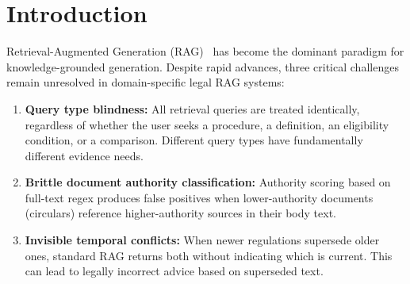 \documentclass[12pt,a4paper]{article}
\begin{document}
\begin{abstract}
\textbf{[I5] Token Cost Tracker:} Every API call in the pipeline logs its exact
prompt and completion token counts. After each query, the system returns a
structured cost breakdown (Groq tokens, Gemini tokens, total USD estimate) alongside
the confidence score, enabling systematic cost/confidence tradeoff analysis across
query types and system configurations.

Evaluated on the 330-question multilingual benchmark introduced in v2, SPIRAL-RAG
v3 achieves Faithfulness 0.856, Answer Relevance 0.891, Context Precision 0.808,
and Context Recall 0.814, representing improvements of $+3.0\%$, $+1.9\%$,
$+3.3\%$, and $+3.2\%$ over v2, and $+27.6\%$ Faithfulness over the Naive-RAG
baseline. The average per-query API cost is \$0.0042 USD at v3 pipeline scale.

\vspace{4pt}
\noindent\textbf{Keywords:} RAG, Legal NLP, Arabic NLP, Query Intent Routing,
Multi-Agent Debate, Temporal Supersession, Adversarial Synthesis, Cost-Aware RAG,
Multilingual QA, Darija.
\end{abstract}

\newpage\tableofcontents\newpage

\section{Introduction}
\label{sec:introduction}

Retrieval-Augmented Generation (RAG)~\cite{lewis2020rag} has become the dominant
paradigm for knowledge-grounded generation. Despite rapid advances, three critical
challenges remain unresolved in domain-specific legal RAG systems:

\begin{enumerate}[leftmargin=*,nosep]
\item \textbf{Query type blindness:} All retrieval queries are treated identically, regardless of whether
the user seeks a procedure, a definition, an eligibility condition, or a comparison.
Different query types have fundamentally different evidence needs.
\item \textbf{Brittle document authority classification:} Authority scoring based on full-text regex
produces false positives when lower-authority documents (circulars) reference
higher-authority sources in their body text.
\item \textbf{Invisible temporal conflicts:} When newer regulations supersede older ones, standard
RAG returns both without indicating which is current. This can lead to legally
incorrect advice based on superseded text.
\end{enumerate}
\end{document}
